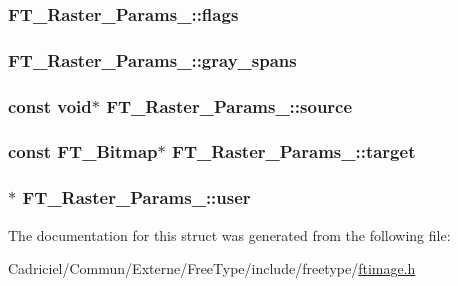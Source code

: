 \hypertarget{struct_f_t___raster___params___a1a28ab69b8296b4378886d1a2b57d333}{
\subsubsection[{flags}]{ F\-T\-\_\-\-Raster\-\_\-\-Params\-\_\-\-::flags}}\label{struct_f_t___raster___params___a1a28ab69b8296b4378886d1a2b57d333}
\hypertarget{struct_f_t___raster___params___a456191f1944775933e3d9d36c8632c35}{
\subsubsection[{gray\-\_\-spans}]{ F\-T\-\_\-\-Raster\-\_\-\-Params\-\_\-\-::gray\-\_\-spans}}\label{struct_f_t___raster___params___a456191f1944775933e3d9d36c8632c35}
\hypertarget{struct_f_t___raster___params___a9be95865384791b018f7a9665a062ee5}{
\subsubsection[{source}]{\setlength{\rightskip}{0pt plus 5cm}const {\bf void}$\ast$ F\-T\-\_\-\-Raster\-\_\-\-Params\-\_\-\-::source}}\label{struct_f_t___raster___params___a9be95865384791b018f7a9665a062ee5}
\hypertarget{struct_f_t___raster___params___a2ba8941740db23ec91302aa9bd154da3}{
\subsubsection[{target}]{\setlength{\rightskip}{0pt plus 5cm}const {\bf F\-T\-\_\-\-Bitmap}$\ast$ F\-T\-\_\-\-Raster\-\_\-\-Params\-\_\-\-::target}}\label{struct_f_t___raster___params___a2ba8941740db23ec91302aa9bd154da3}
\hypertarget{struct_f_t___raster___params___af78bac59f93c989840bbcbcbefd77c55}{
\subsubsection[{user}]{$\ast$ F\-T\-\_\-\-Raster\-\_\-\-Params\-\_\-\-::user}}\label{struct_f_t___raster___params___af78bac59f93c989840bbcbcbefd77c55}


The documentation for this struct was generated from the following file\-:\begin{DoxyCompactItemize}
\item 
Cadriciel/\-Commun/\-Externe/\-Free\-Type/include/freetype/\hyperlink{ftimage_8h}{ftimage.\-h}\end{DoxyCompactItemize}
